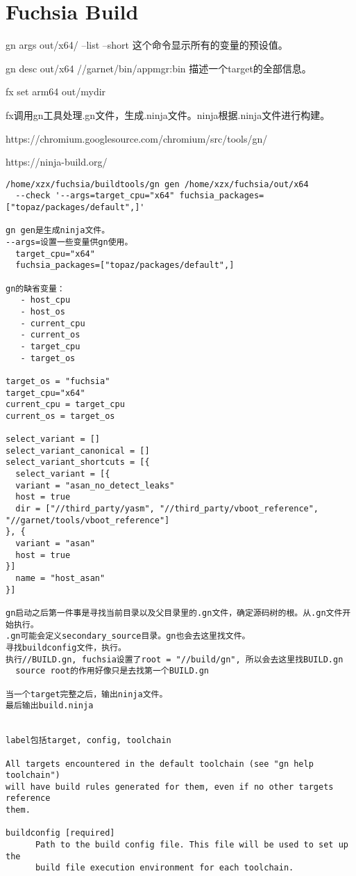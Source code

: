 \section{Fuchsia Build}
gn args out/x64/ --list --short
这个命令显示所有的变量的预设值。

gn desc out/x64 //garnet/bin/appmgr:bin
描述一个target的全部信息。


fx set arm64 out/mydir

fx调用gn工具处理.gn文件，生成.ninja文件。ninja根据.ninja文件进行构建。

https://chromium.googlesource.com/chromium/src/tools/gn/

https://ninja-build.org/

\begin{verbatim}
/home/xzx/fuchsia/buildtools/gn gen /home/xzx/fuchsia/out/x64 
  --check '--args=target_cpu="x64" fuchsia_packages=["topaz/packages/default",]'

gn gen是生成ninja文件。
--args=设置一些变量供gn使用。
  target_cpu="x64" 
  fuchsia_packages=["topaz/packages/default",]

gn的缺省变量：
   - host_cpu
   - host_os
   - current_cpu
   - current_os
   - target_cpu
   - target_os

target_os = "fuchsia"
target_cpu="x64"
current_cpu = target_cpu
current_os = target_os

select_variant = []
select_variant_canonical = []
select_variant_shortcuts = [{
  select_variant = [{
  variant = "asan_no_detect_leaks"
  host = true
  dir = ["//third_party/yasm", "//third_party/vboot_reference", "//garnet/tools/vboot_reference"]
}, {
  variant = "asan"
  host = true
}]
  name = "host_asan"
}]

gn启动之后第一件事是寻找当前目录以及父目录里的.gn文件，确定源码树的根。从.gn文件开始执行。
.gn可能会定义secondary_source目录。gn也会去这里找文件。
寻找buildconfig文件，执行。
执行//BUILD.gn, fuchsia设置了root = "//build/gn", 所以会去这里找BUILD.gn
  source root的作用好像只是去找第一个BUILD.gn

当一个target完整之后，输出ninja文件。
最后输出build.ninja


label包括target, config, toolchain

All targets encountered in the default toolchain (see "gn help toolchain")
will have build rules generated for them, even if no other targets reference
them.

buildconfig [required]
      Path to the build config file. This file will be used to set up the
      build file execution environment for each toolchain.


\end{verbatim}
